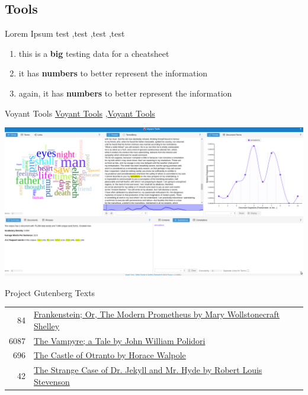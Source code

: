\documentclass[10pt,a4paper]{article}
\begin{document}
\begin{multicols}{3}
\section{Tools}



\begin{textbox}{Lorem Ipsum}
test  \sep test \sep test \sep test

\bigskip

\begin{enumerate}
\item this is a \textbf {big} testing data for a cheatsheet 
\item it has \textbf {numbers} to better represent the information
\item again, it has \textbf {numbers} to better represent the information
\end{enumerate}

\end{textbox}


\begin{textbox}{Voyant Tools}
 \href{https://voyant-tools.org/}{Voyant Tools} \sep \href{https://voyant-tools.org/}{Voyant Tools}

\includegraphics[width=\textwidth]{voyant.png}
\end{textbox}




\begin{textbox}{Project Gutenberg Texts}
\begin{tabular}{r|p{}}\scriptsize
    84 & \href{http://www.gutenberg.org/ebooks/84}{Frankenstein; Or, The Modern Prometheus by Mary Wollstonecraft Shelley} \\
    6087 & \href{https://www.gutenberg.org/ebooks/6087}{The Vampyre; a Tale by John William Polidori} \\
    696 & \href{https://www.gutenberg.org/ebooks/696}{The Castle of Otranto by Horace Walpole} \\
    42 & \href{https://www.gutenberg.org/ebooks/42}{The Strange Case of Dr. Jekyll and Mr. Hyde by Robert Louis Stevenson}
\end{tabular}


\end{textbox}
\end{multicols}
\end{document}
